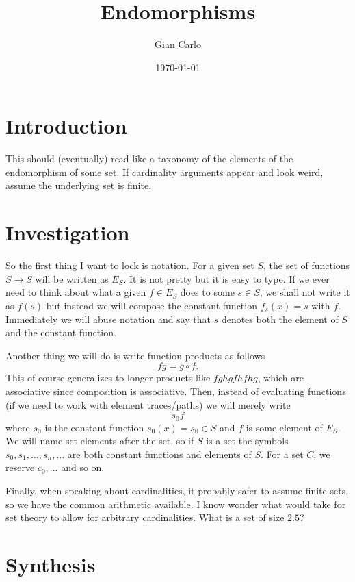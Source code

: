 \documentclass[11pt]{article}
\title{Endomorphisms}
\author{Gian Carlo}
\date{\today}
\theoremstyle{plain}
\theoremstyle{nonumberplain}
\begin{document}
\maketitle


\section{Introduction}

This should (eventually) read like a taxonomy of the elements of the endomorphism of some set. If cardinality arguments appear and look weird, assume the underlying set is finite.

\section{Investigation}

So the first thing I want to lock is notation. For a given set $S$, the set of functions $S \to S$ will be written as $E_S$. It is not pretty but it is easy to type. If we ever need to think about what a given $f \in E_S$ does to some $s \in S$, we shall not write it as $f(s)$ but instead we will compose the constant function $f_s(x) = s$ with $f$. Immediately we will abuse notation and say that $s$ denotes both the element of $S$ and the constant function.

Another thing we will do is write function products as follows \begin{equation}
    fg = g \circ f.
\end{equation}
This of course generalizes to longer products like $fghgfhfhg$, which are associative since composition is associative. Then, instead of evaluating functions (if we need to work with element traces/paths) we will merely write \begin{equation}
    s_0f
\end{equation}
where $s_0$ is the constant function $s_0(x) = s_0 \in S$ and $f$ is some element of $E_S$. We will name set elements after the set, so if $S$ is a set the symbols $s_0, s_1, ..., s_n, ...$ are both constant functions and elements of $S$. For a set $C$, we reserve $c_0, ...$ and so on.

Finally, when speaking about cardinalities, it probably safer to assume finite sets, so we have the common arithmetic available. I know wonder what would take for set theory to allow for arbitrary cardinalities. What is a set of size $2.5$?

\section{Synthesis}
\end{document}
